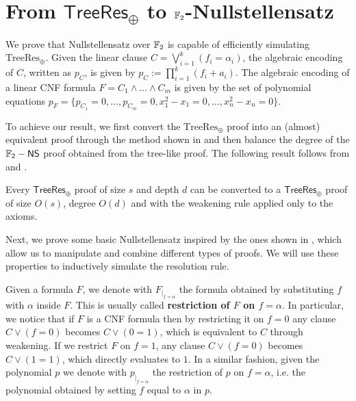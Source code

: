 \section{From $\mathsf{TreeRes}_\oplus$ to $\mathbb{F}_2$-Nullstellensatz}

We prove that Nullstellensatz over $\mathbb{F}_2$ is capable of efficiently simulating $\mathrm{TreeRes}_\oplus$. Given the linear clause $C = \bigvee_{i = 1}^k (f_i = \alpha_i)$, the algebraic encoding of $C$, written as $p_C$, is given by $p_C := \prod_{i = 1}^{k} (f_i + a_i)$. The algebraic encoding of a linear CNF formula $F = C_1 \land \ldots \land C_m$ is given by the set of polynomial equations $p_F = \{p_{C_1} = 0, \ldots, p_{C_m} = 0, x_1^2-x_1 = 0, \ldots, x_n^2-x_n = 0\}$.

To achieve our result, we first convert the $\mathrm{TreeRes}_\oplus$ proof into an (almost) equivalent proof through the method shown in  and then balance the degree of the $\mathsf{\mathbb{F}_2-NS}$ proof obtained from the tree-like proof. The following result follows from  and .

\begin{corollary}
    \label{leaf_weakening}
 Every $\mathsf{TreeRes}_{\oplus}$ proof of size $s$ and depth $d$ can be converted to a $\mathsf{TreeRes}_{\oplus}$ proof of size $O(s)$, degree $O(d)$ and with the weakening rule applied only to the axioms.
\end{corollary}

Next, we prove some basic Nullstellensatz inspired by the ones shown in \cite{groebner}, which allow us to manipulate and combine different types of proofs. We will use these properties to inductively simulate the resolution rule.

Given a formula $F$, we denote with $F_{\mid_{f = \alpha}}$ the formula obtained by substituting $f$ with $\alpha$ inside $F$. This is usually called \textbf{restriction of $F$ on $f = \alpha$}. In particular, we notice that if $F$ is a CNF formula then by restricting it on $f = 0$ any clause $C \lor (f = 0)$ becomes $C \lor (0 = 1)$, which is equivalent to $C$ through weakening. If we restrict $F$ on $f = 1$, any clause $C \lor (f = 0)$ becomes $C \lor (1=1)$, which directly evaluates to $1$.
In a similar fashion, given the polynomial $p$ we denote with $p_{\mid_{f = \alpha}}$ the restriction of $p$ on $f = \alpha$, i.e. the polynomial obtained by setting $f$ equal to $\alpha$ in $p$.

